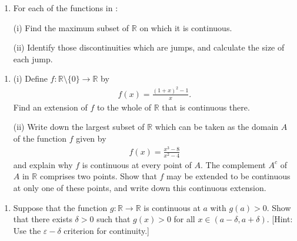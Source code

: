 \documentclass[letterpaper,10pt,english]{jupyterBook}
\begin{document}
\label{\detokenize{Problems:id17}}\begin{enumerate}
%
\setcounter{enumi}{16}
\item {} 
\sphinxAtStartPar
For each of the functions in {\hyperref[\detokenize{Problems:id7}]{}}:

\sphinxAtStartPar
(i) Find the maximum subset of \(\mathbb{R}\) on which it is continuous.

\sphinxAtStartPar
(ii) Identify those discontinuities which are jumps, and calculate the size of each jump.

\end{enumerate}
\label{\detokenize{Problems:id18}}\begin{enumerate}
%
\setcounter{enumi}{17}
\item {} 
\sphinxAtStartPar
(i) Define \(f:\mathbb{R} \setminus \{0\} \rightarrow \mathbb{R}\) by
\begin{equation*}
\begin{split}
    f(x) = \displaystyle\frac{(1 + x)^{2} - 1}{x}.
    \end{split}
\end{equation*}
\sphinxAtStartPar
Find an extension of \(f\) to the whole of \(\mathbb{R}\) that is continuous there.

\sphinxAtStartPar
(ii) Write down the largest subset of \(\mathbb{R}\) which can be taken as the domain \(A\) of the function \(f\) given by
\begin{equation*}
\begin{split}
    f(x) = \displaystyle\frac{x^{3}-8}{x^{2} - 4}
    \end{split}
\end{equation*}
\sphinxAtStartPar
and explain why \(f\) is continuous at every point of \(A\). The complement \(A^{c}\) of \(A\) in \(\mathbb{R}\) comprises two points. Show that \(f\) may be extended to be continuous at only one of these points, and write down this continuous extension.

\end{enumerate}
\label{\detokenize{Problems:id19}}\begin{enumerate}
%
\setcounter{enumi}{18}
\item {} 
\sphinxAtStartPar
{} Suppose that the function \(g: \mathbb{R} \rightarrow \mathbb{R}\) is continuous at \(a\) with \(g(a) > 0\). Show that there exists \(\delta > 0\) such that \(g(x) > 0\)  for all \( x \in (a - \delta, a + \delta)\). {[}Hint: Use the \(\varepsilon-\delta\) criterion for continuity.{]}

\end{enumerate}
\end{document}
